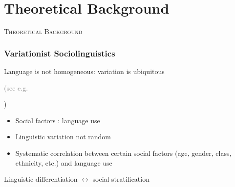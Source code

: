 \documentclass[12pt, table]{beamer}
\begin{document}
\section{Theoretical Background}
\begin{frame}
\begin{center}
\textsc{\textcolor{uq}{Theoretical Background}}
\end{center}
\end{frame}

\begin{frame}
\frametitle{Variationist Sociolinguistics}
Language is not homogeneous: variation is ubiquitous \textcolor{gray}{\begin{scriptsize} (see e.g. \citet{labov1994principles} \citet{labov2001principles} \citet{labov2011principles} \citet{tagliamonte2011variationist} \end{scriptsize}})
\begin{itemize}
\item  Social factors : language use
\item  Linguistic variation not random
\item  Systematic correlation between certain social factors (age, gender, class, ethnicity, etc.) and language use
\end{itemize}
Linguistic differentiation $\leftrightarrow$ social stratification
\end{frame}
\end{document}
